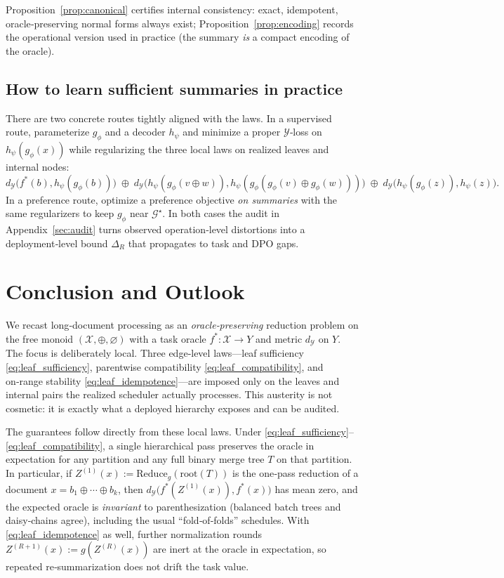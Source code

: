 \documentclass[11pt]{article}
\newcommand{\Strings}{\mathcal{X}}       %
\newcommand{\Y}{\mathcal{Y}}               %
\newcommand{\fstar}{f^*}               %
\newcommand{\Gstar}{\mathcal{G}^\star}     %
\newcommand{\concat}{\oplus}                    %
\newcommand{\metric}{d_{\Y}}
\newcommand{\reduce}{\text{Reduce}}
\newcommand{\reduceg}{\reduce_g}
\begin{document}
Proposition~\ref{prop:canonical} certifies internal consistency: exact, idempotent, oracle‑preserving normal forms always exist; Proposition~\ref{prop:encoding} records the operational version used in practice (the summary \emph{is} a compact encoding of the oracle).


\subsection{How to learn sufficient summaries in practice}
\label{sec:learning-g}

There are two concrete routes tightly aligned with the laws. In a supervised route, parameterize $g_\phi$ and a decoder $h_\psi$ and minimize a proper $\Y$‑loss on $h_\psi(g_\phi(x))$ while regularizing the three local laws on realized leaves and internal nodes:
\[
\metric\!\big(\fstar(b),h_\psi(g_\phi(b))\big)\;\concat \;
\metric\!\big(h_\psi(g_\phi(v\concat w)),h_\psi(g_\phi(g_\phi(v)\concat g_\phi(w)))\big)\;\concat \;
\metric\!\big(h_\psi(g_\phi(z)),h_\psi(z)\big).
\]
In a preference route, optimize a preference objective \emph{on summaries} with the same regularizers to keep $g_\phi$ near $\Gstar$. In both cases the audit in Appendix~\ref{sec:audit} turns observed operation‑level distortions into a deployment‑level bound $\Delta_R$ that propagates to task and DPO gaps.



\section{Conclusion and Outlook}\label{sec:conclusion}

We recast long‑document processing as an \emph{oracle‑preserving} reduction problem on the free monoid $(\Strings,\concat,\varnothing)$ with a task oracle $\fstar:\Strings\to Y$ and metric $\metric$ on $Y$. The focus is deliberately local. Three edge‑level laws—leaf sufficiency \ref{eq:leaf_sufficiency}, parentwise compatibility \ref{eq:leaf_compatibility}, and on‑range stability \ref{eq:leaf_idempotence}—are imposed only on the leaves and internal pairs the realized scheduler actually processes. This austerity is not cosmetic: it is exactly what a deployed hierarchy exposes and can be audited.

The guarantees follow directly from these local laws. Under \ref{eq:leaf_sufficiency}–\ref{eq:leaf_compatibility}, a single hierarchical pass preserves the oracle in expectation for any partition and any full binary merge tree $T$ on that partition. In particular, if $Z^{(1)}(x):=\reduceg(\mathrm{root}(T))$ is the one‑pass reduction of a document $x=b_1\concat \cdots\concat b_k$, then $\metric\!\big(\fstar(Z^{(1)}(x)),\fstar(x)\big)$ has mean zero, and the expected oracle is \emph{invariant} to parenthesization (balanced batch trees and daisy‑chains agree), including the usual ``fold‑of‑folds'' schedules. With \ref{eq:leaf_idempotence} as well, further normalization rounds $Z^{(R+ 1)}(x):=g(Z^{(R)}(x))$ are inert at the oracle in expectation, so repeated re‑summarization does not drift the task value.
\end{document}
